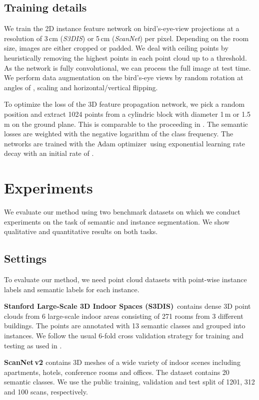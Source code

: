 \documentclass[runningheads]{llncs}
\newcommand{\subsubsubsection}[1]{\vspace{4px} \noindent \textbf{#1}}
\begin{document}
{\subsection{Training details}
We train the 2D instance feature network on bird's-eye-view projections at a resolution of 3\,cm (\textit{S3DIS}) or 5\,cm (\textit{ScanNet}) per pixel. Depending on the room size, images are either cropped or padded.
We deal with ceiling points by heuristically removing the highest points in each point cloud up to a threshold.
As the network is fully convolutional, we can process the full image at test time.
We perform data augmentation on the bird's-eye views  by random rotation at angles of , scaling and horizontal/vertical flipping.

To optimize the loss of the 3D feature propagation network, we pick a random position and extract 1024 points from a cylindric block with diameter 1\,m or 1.5\,m on the ground plane. This is comparable to the proceeding in \cite{Qi17CVPR,Wang18CoRR}. The semantic losses are weighted with the negative logarithm of the class frequency.
The networks are trained with the Adam optimizer\,\cite{Kingma15ICLR} using exponential learning rate decay with an initial rate of .

 


\section{Experiments}
We evaluate our method using two benchmark datasets on which we conduct experiments on the task of semantic and instance segmentation.
We show qualitative and quantitative results on both tasks.

\subsection{Settings}
To evaluate our method, we need point cloud datasets with point-wise instance labels and semantic labels for each instance.

\subsubsubsection{Stanford Large-Scale 3D Indoor Spaces (S3DIS)\,\cite{Armeni16CVPR}}
contains dense 3D point clouds from 6 large-scale indoor areas consisting of  271 rooms from 3 different buildings.
The points are annotated with 13 semantic classes and grouped into instances.
We follow the usual 6-fold cross validation strategy for training and testing as used in \cite{Qi17CVPR}.

\subsubsubsection{ScanNet\,v2 \cite{Dai17CVPR}} contains 3D meshes of a wide variety of indoor scenes including apartments, hotels, conference rooms and offices.
The dataset contains 20 semantic classes.
We use the public training, validation and test split of 1201, 312 and 100 scans, respectively.

}
\end{document}
